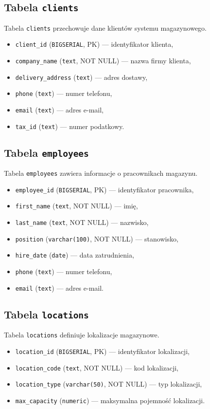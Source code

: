 \subsection{Tabela \texttt{clients}}

Tabela \texttt{clients} przechowuje dane klientów systemu magazynowego.
\begin{itemize}
    \item \texttt{client\_id} (\texttt{BIGSERIAL}, PK) — identyfikator klienta,
    \item \texttt{company\_name} (\texttt{text}, NOT NULL) — nazwa firmy klienta,
    \item \texttt{delivery\_address} (\texttt{text}) — adres dostawy,
    \item \texttt{phone} (\texttt{text}) — numer telefonu,
    \item \texttt{email} (\texttt{text}) — adres e-mail,
    \item \texttt{tax\_id} (\texttt{text}) — numer podatkowy.
\end{itemize}

\subsection{Tabela \texttt{employees}}

Tabela \texttt{employees} zawiera informacje o pracownikach magazynu.
\begin{itemize}
    \item \texttt{employee\_id} (\texttt{BIGSERIAL}, PK) — identyfikator pracownika,
    \item \texttt{first\_name} (\texttt{text}, NOT NULL) — imię,
    \item \texttt{last\_name} (\texttt{text}, NOT NULL) — nazwisko,
    \item \texttt{position} (\texttt{varchar(100)}, NOT NULL) — stanowisko,
    \item \texttt{hire\_date} (\texttt{date}) — data zatrudnienia,
    \item \texttt{phone} (\texttt{text}) — numer telefonu,
    \item \texttt{email} (\texttt{text}) — adres e-mail.
\end{itemize}

\subsection{Tabela \texttt{locations}}

Tabela \texttt{locations} definiuje lokalizacje magazynowe.
\begin{itemize}
    \item \texttt{location\_id} (\texttt{BIGSERIAL}, PK) — identyfikator lokalizacji,
    \item \texttt{location\_code} (\texttt{text}, NOT NULL) — kod lokalizacji,
    \item \texttt{location\_type} (\texttt{varchar(50)}, NOT NULL) — typ lokalizacji,
    \item \texttt{max\_capacity} (\texttt{numeric}) — maksymalna pojemność lokalizacji.
\end{itemize}

